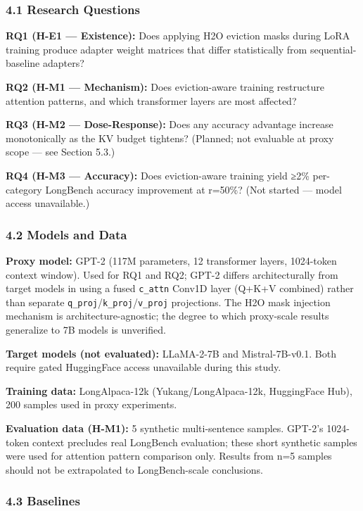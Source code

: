 
\subsubsection{4.1 Research Questions}

\textbf{RQ1 (H-E1 — Existence):} Does applying H2O eviction masks during LoRA training produce adapter weight matrices that differ statistically from sequential-baseline adapters?

\textbf{RQ2 (H-M1 — Mechanism):} Does eviction-aware training restructure attention patterns, and which transformer layers are most affected?

\textbf{RQ3 (H-M2 — Dose-Response):} Does any accuracy advantage increase monotonically as the KV budget tightens? (Planned; not evaluable at proxy scope — see Section 5.3.)

\textbf{RQ4 (H-M3 — Accuracy):} Does eviction-aware training yield ≥2\% per-category LongBench accuracy improvement at r=50\%? (Not started — model access unavailable.)

\subsubsection{4.2 Models and Data}

\textbf{Proxy model:} GPT-2 (117M parameters, 12 transformer layers, 1024-token context window). Used for RQ1 and RQ2; GPT-2 differs architecturally from target models in using a fused \texttt{c_attn} Conv1D layer (Q+K+V combined) rather than separate \texttt{q_proj}/\texttt{k_proj}/\texttt{v_proj} projections. The H2O mask injection mechanism is architecture-agnostic; the degree to which proxy-scale results generalize to 7B models is unverified.

\textbf{Target models (not evaluated):} LLaMA-2-7B and Mistral-7B-v0.1. Both require gated HuggingFace access unavailable during this study.

\textbf{Training data:} LongAlpaca-12k (Yukang/LongAlpaca-12k, HuggingFace Hub), 200 samples used in proxy experiments.

\textbf{Evaluation data (H-M1):} 5 synthetic multi-sentence samples. GPT-2's 1024-token context precludes real LongBench evaluation; these short synthetic samples were used for attention pattern comparison only. Results from n=5 samples should not be extrapolated to LongBench-scale conclusions.

\subsubsection{4.3 Baselines}


